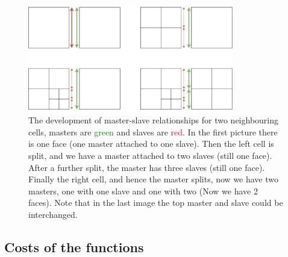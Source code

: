 \documentclass{article}
\begin{document}
\begin{figure}[h!]
\centering
\includegraphics[width=0.8\textwidth]{images/splitting-procedure.png}
\caption{The development of master-slave relationships for two neighbouring cells, masters are \textcolor{green}{green} and slaves are \textcolor{red}{red}. In the first picture there is one face (one master attached to one slave). Then the left cell is split, and we have a master attached to two slaves (still one face). After a further split, the master has three slaves (still one face). Finally the right cell, and hence the master splits, now we have two masters, one with one slave and one with two (Now we have 2 faces). Note that in the last image the top master and slave could be interchanged.}\label{splitting-proc}
\end{figure}
\newpage



\subsection{Costs of the functions}
\end{document}
